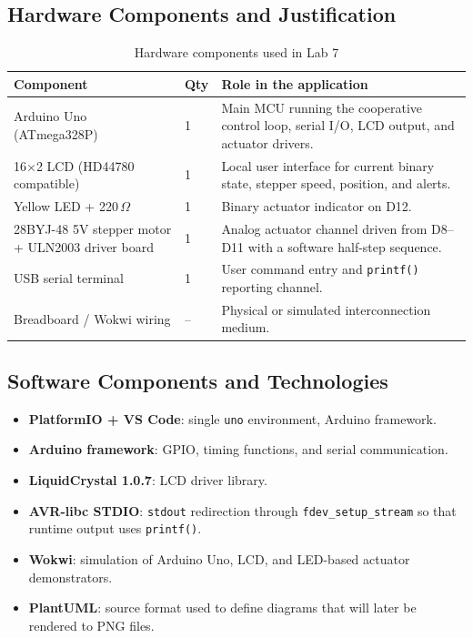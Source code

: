 \documentclass[12pt]{article}
\begin{document}
\subsection{Hardware Components and Justification}

\begin{table}[H]
\centering
\begin{tabular}{p{4.4cm} p{1.5cm} p{7.1cm}}
\toprule
\textbf{Component} & \textbf{Qty} & \textbf{Role in the application} \\
\midrule
Arduino Uno (ATmega328P) & 1 & Main MCU running the cooperative control loop, serial I/O, LCD output, and actuator drivers. \\
16$\times$2 LCD (HD44780 compatible) & 1 & Local user interface for current binary state, stepper speed, position, and alerts. \\
Yellow LED + 220\,$\Omega$ & 1 & Binary actuator indicator on D12. \\
28BYJ-48 5V stepper motor + ULN2003 driver board & 1 & Analog actuator channel driven from D8--D11 with a software half-step sequence. \\
USB serial terminal & 1 & User command entry and \texttt{printf()} reporting channel. \\
Breadboard / Wokwi wiring & -- & Physical or simulated interconnection medium. \\
\bottomrule
\end{tabular}
\caption{Hardware components used in Lab 7}
\label{tab:hardware}
\end{table}

\subsection{Software Components and Technologies}

\begin{itemize}
    \item \textbf{PlatformIO + VS Code}: single \texttt{uno} environment, Arduino framework.
    \item \textbf{Arduino framework}: GPIO, timing functions, and serial communication.
    \item \textbf{LiquidCrystal 1.0.7}: LCD driver library.
    \item \textbf{AVR-libc STDIO}: \texttt{stdout} redirection through \texttt{fdev\_setup\_stream} so that runtime output uses \texttt{printf()}.
    \item \textbf{Wokwi}: simulation of Arduino Uno, LCD, and LED-based actuator demonstrators.
    \item \textbf{PlantUML}: source format used to define diagrams that will later be rendered to PNG files.
\end{itemize}
\end{document}
